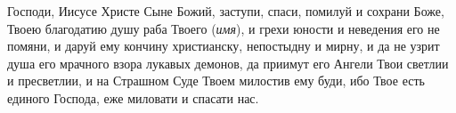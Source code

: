 \mychapterending


\begin{mymulticols}
 


Господи, Иисусе Христе Сыне Божий, заступи, спаси, помилуй и сохрани Боже, Твоею благодатию душу раба Твоего ({\itshape имя}), и грехи юности и неведения его не помяни, и даруй ему кончину христианску, непостыдну и мирну, и да не узрит душа его мрачного взора лукавых демонов, да приимут его Ангели Твои светлии и пресветлии, и на Страшном Суде Твоем милостив ему буди, ибо Твое есть единого Господа, еже миловати и спасати нас. 

\end{mymulticols}

\mychapterending


